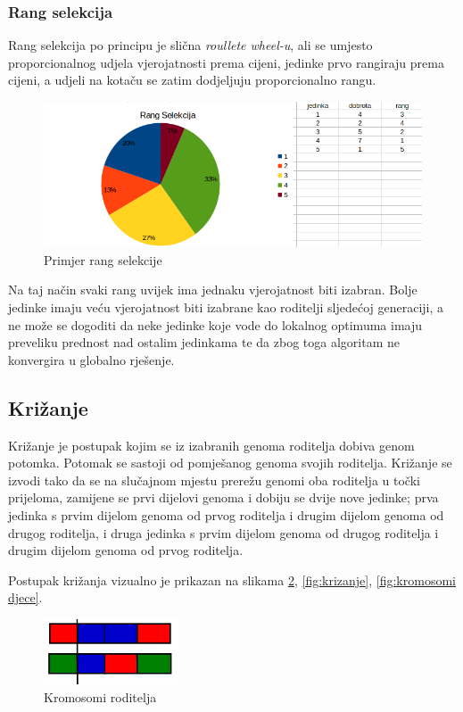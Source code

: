 \documentclass[times, utf8, zavrsni]{fer}
\begin{document}
\subsubsection{Rang selekcija}
Rang selekcija po principu je slična \textit{roullete wheel-u}, ali se umjesto proporcionalnog udjela vjerojatnosti prema cijeni, jedinke prvo rangiraju prema cijeni, a udjeli na kotaču se zatim dodjeljuju proporcionalno rangu.

\begin{figure}[htb]
\centering
\includegraphics[width=14cm]{images/rang_selekcija.png}
\caption{Primjer rang selekcije}
\label{fig:rang selekcija}
\end{figure}

Na taj način svaki rang uvijek ima jednaku vjerojatnost biti izabran. Bolje jedinke imaju veću vjerojatnost biti izabrane kao roditelji sljedećoj generaciji, a ne može se dogoditi da neke jedinke koje vode do lokalnog optimuma imaju preveliku prednost nad ostalim jedinkama te da zbog toga algoritam ne konvergira u globalno rješenje.

\subsection{Križanje}
Križanje je postupak kojim se iz izabranih genoma roditelja dobiva genom potomka. Potomak se sastoji od pomješanog genoma svojih roditelja. Križanje se izvodi tako da se na slučajnom mjestu prerežu genomi oba roditelja u točki prijeloma, zamijene se prvi dijelovi genoma i dobiju se dvije nove jedinke; prva jedinka s prvim dijelom genoma od prvog roditelja i drugim dijelom genoma od drugog roditelja, i druga jedinka s prvim dijelom genoma od drugog roditelja i drugim dijelom genoma od prvog roditelja.

Postupak križanja vizualno je prikazan na slikama \ref{fig:kromosomi roditelja}, \ref{fig:krizanje}, \ref{fig:kromosomi djece}.

\begin{figure}[htb]
\centering
\includegraphics[width=4cm]{images/kromosomi_roditelja.png}
\caption{Kromosomi roditelja}
\label{fig:kromosomi roditelja}
\end{figure}
\end{document}
